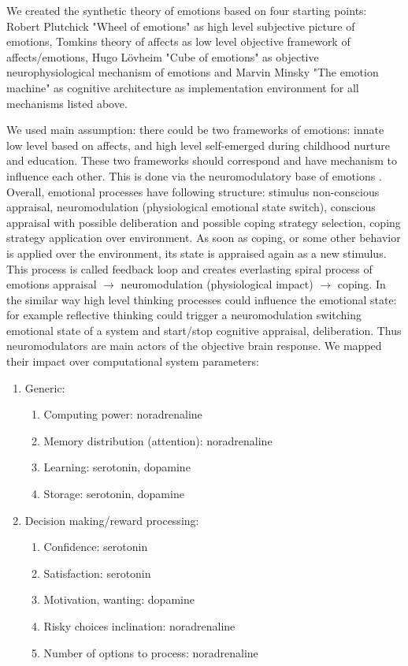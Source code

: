 We created the synthetic theory of emotions based on four starting points: Robert Plutchick "Wheel of emotions" \cite{natureofemotions, senticcomputing} as high level subjective picture of emotions, Tomkins theory of affects \cite{primer_affect_psychology} as low level objective framework of affects/emotions, Hugo L\"{o}vheim "Cube of emotions" \cite{cubeofemotions} as objective neurophysiological mechanism of emotions and Marvin Minsky "The emotion machine" \cite{emotionmachine} as cognitive architecture as implementation environment for all mechanisms listed above.

We used main assumption: there could be two frameworks of emotions: innate low level based on affects, and high level self-emerged during childhood nurture and education. These two frameworks should correspond and have mechanism to influence each other. This is done via the neuromodulatory base of emotions \cite{cubeofemotions, neuromodulatory}.
Overall, emotional processes have following structure: stimulus non-conscious appraisal, neuromodulation (physiological emotional state switch), conscious appraisal with possible deliberation and possible coping strategy selection, coping strategy application over environment. As soon as coping, or some other behavior is applied over the environment, its state is appraised again as a new stimulus. This process is called feedback loop \cite{natureofemotions} and creates everlasting spiral process of emotions appraisal $\rightarrow$ neuromodulation (physiological impact) $\rightarrow$ coping. In the similar way high level thinking processes could influence the emotional state: for example reflective thinking could trigger a neuromodulation switching emotional state of a system and start/stop cognitive appraisal, deliberation.
Thus neuromodulators are main actors of the objective brain response. We mapped their impact over computational system parameters:

\begin{enumerate}
 \item  Generic:
 \begin{enumerate}
  \item  Computing power: noradrenaline
  \item  Memory distribution (attention): noradrenaline
  \item  Learning: serotonin, dopamine
  \item  Storage: serotonin, dopamine
 \end{enumerate}
 \item  Decision making/reward processing:
 \begin{enumerate}
  \item  Confidence: serotonin
  \item  Satisfaction: serotonin
  \item  Motivation, wanting: dopamine
  \item  Risky choices inclination: noradrenaline
  \item  Number of options to process: noradrenaline
 \end{enumerate}
\end{enumerate}

